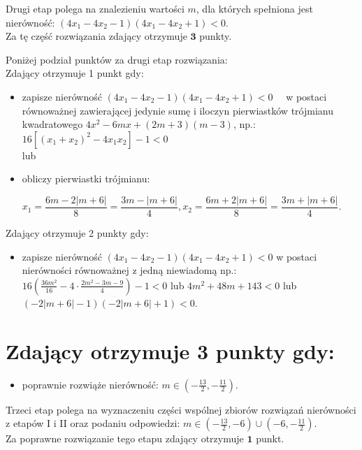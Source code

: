 \documentclass[10pt]{article}
\begin{document}
Drugi etap polega na znalezieniu wartości $m$, dla których spełniona jest nierówność: $\left(4 x_{1}-4 x_{2}-1\right)\left(4 x_{1}-4 x_{2}+1\right)<0$.\\
Za tę część rozwiązania zdający otrzymuje $\mathbf{3}$ punkty.

Poniżej podział punktów za drugi etap rozwiązania:\\
Zdający otrzymuje 1 punkt gdy:

\begin{itemize}
  \item zapisze nierówność $\left(4 x_{1}-4 x_{2}-1\right)\left(4 x_{1}-4 x_{2}+1\right)<0 \quad$ w postaci równoważnej zawierającej jedynie sumę i iloczyn pierwiastków trójmianu kwadratowego $4 x^{2}-6 m x+(2 m+3)(m-3)$, np.: $16\left[\left(x_{1}+x_{2}\right)^{2}-4 x_{1} x_{2}\right]-1<0$\\
lub
  \item obliczy pierwiastki trójmianu:
\end{itemize}

$$
x_{1}=\frac{6 m-2|m+6|}{8}=\frac{3 m-|m+6|}{4}, x_{2}=\frac{6 m+2|m+6|}{8}=\frac{3 m+|m+6|}{4} .
$$

Zdający otrzymuje 2 punkty gdy:

\begin{itemize}
  \item zapisze nierówność $\left(4 x_{1}-4 x_{2}-1\right)\left(4 x_{1}-4 x_{2}+1\right)<0$ w postaci nierówności równoważnej z jedną niewiadomą np.: $16\left(\frac{36 m^{2}}{16}-4 \cdot \frac{2 m^{2}-3 m-9}{4}\right)-1<0$ lub $4 m^{2}+48 m+143<0$ lub $(-2|m+6|-1)(-2|m+6|+1)<0$.
\end{itemize}

\section*{Zdający otrzymuje $\mathbf{3}$ punkty gdy:}
\begin{itemize}
  \item poprawnie rozwiąże nierówność: $m \in\left(-\frac{13}{2},-\frac{11}{2}\right)$.
\end{itemize}

Trzeci etap polega na wyznaczeniu części wspólnej zbiorów rozwiązań nierówności z etapów I i II oraz podaniu odpowiedzi: $m \in\left(-\frac{13}{2},-6\right) \cup\left(-6,-\frac{11}{2}\right)$.\\
Za poprawne rozwiązanie tego etapu zdający otrzymuje $\mathbf{1}$ punkt.
\end{document}
